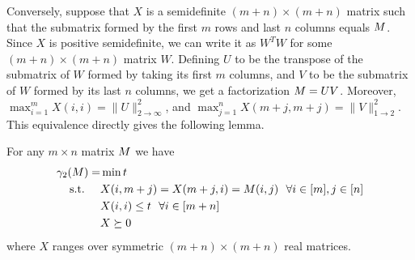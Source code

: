 Conversely, suppose that $X$
is a semidefinite $(m+n) \times (m+n)$ matrix such that the submatrix
formed by the first $m$ rows and last $n$ columns equals $M$. Since
$X$ is positive semidefinite, we can write it as $W^T W$ for some
$(m+n) \times (m+n)$ matrix $W$. Defining $U$ to be the transpose of
the submatrix of $W$ formed by taking its first $m$ columns, and $V$
to be the submatrix of $W$ formed by its last $n$ columns, we get a
factorization $M = UV$. Moreover,
$\max_{i = 1}^m X(i,i) = \|U\|_{2\to\infty}^2$, and
$\max_{j=1}^n X(m+j,m+j) = \|V\|_{1\to 2}^2$. %
This equivalence directly gives the following lemma.
\begin{lemma}\label{lm:ch7-fact-sdp}
  For any $m\times n$ matrix $M$ we have
  \begin{align}
    \gamma_2(M) = &\min t \label{eq:ch7-sdp-obj} \\
                 \text{s.t. \,\,\, }    &X(i,m+j) = X(m+j,i) =M(i,j) \ \ \forall i\in [m], j \in [n]
                    \label{eq:ch7-sdp-eq}\\
                     &X(i,i) \le t\ \ \forall i \in [m+n]\\
                     &X \succeq 0\label{eq:ch7-sdp-psd}
  \end{align}
  where $X$ ranges over symmetric $(m+n) \times (m+n)$
  real matrices. 
\end{lemma}
